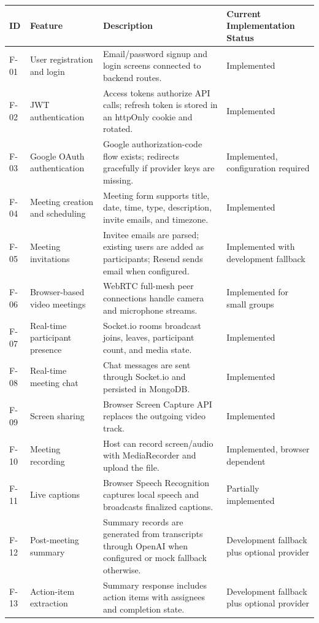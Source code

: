 \documentclass[11pt,a4paper]{article}
\begin{document}
\begin{table}[H]
\centering
\small
{}
\begin{tabularx}{\linewidth}{L{1.1cm} L{3.1cm} Y L{2.8cm}}
\toprule
\textbf{ID} & \textbf{Feature} & \textbf{Description} & \textbf{Current Implementation Status}\\
\midrule
F-01 & User registration and login & Email/password signup and login screens connected to backend routes. & Implemented\\
F-02 & JWT authentication & Access tokens authorize API calls; refresh token is stored in an httpOnly cookie and rotated. & Implemented\\
F-03 & Google OAuth authentication & Google authorization-code flow exists; redirects gracefully if provider keys are missing. & Implemented, configuration required\\
F-04 & Meeting creation and scheduling & Meeting form supports title, date, time, type, description, invite emails, and timezone. & Implemented\\
F-05 & Meeting invitations & Invitee emails are parsed; existing users are added as participants; Resend sends email when configured. & Implemented with development fallback\\
F-06 & Browser-based video meetings & WebRTC full-mesh peer connections handle camera and microphone streams. & Implemented for small groups\\
F-07 & Real-time participant presence & Socket.io rooms broadcast joins, leaves, participant count, and media state. & Implemented\\
F-08 & Real-time meeting chat & Chat messages are sent through Socket.io and persisted in MongoDB. & Implemented\\
F-09 & Screen sharing & Browser Screen Capture API replaces the outgoing video track. & Implemented\\
F-10 & Meeting recording & Host can record screen/audio with MediaRecorder and upload the file. & Implemented, browser dependent\\
F-11 & Live captions & Browser Speech Recognition captures local speech and broadcasts finalized captions. & Partially implemented\\
F-12 & Post-meeting summary & Summary records are generated from transcripts through OpenAI when configured or mock fallback otherwise. & Development fallback plus optional provider\\
F-13 & Action-item extraction & Summary response includes action items with assignees and completion state. & Development fallback plus optional provider\\

\end{tabularx}
\end{table}
\end{document}
